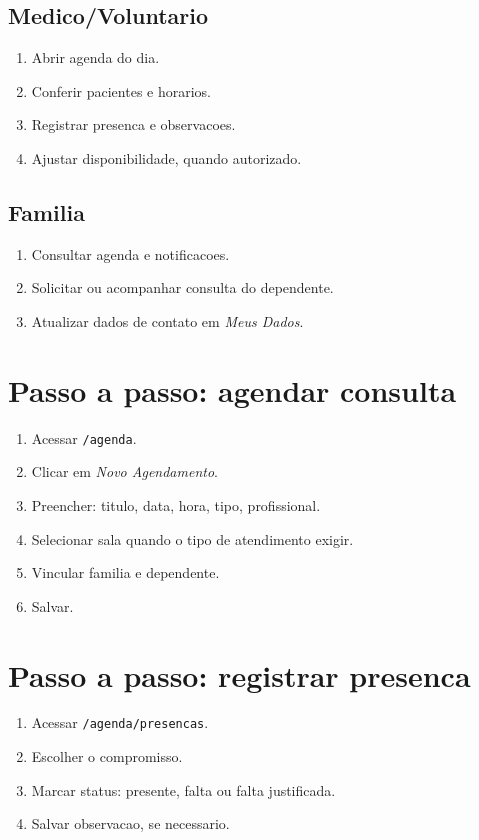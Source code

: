 \documentclass[12pt,a4paper]{article}
\begin{document}
\subsection{Medico/Voluntario}
\begin{enumerate}
\item Abrir agenda do dia.
\item Conferir pacientes e horarios.
\item Registrar presenca e observacoes.
\item Ajustar disponibilidade, quando autorizado.
\end{enumerate}

\subsection{Familia}
\begin{enumerate}
\item Consultar agenda e notificacoes.
\item Solicitar ou acompanhar consulta do dependente.
\item Atualizar dados de contato em \textit{Meus Dados}.
\end{enumerate}

\section{Passo a passo: agendar consulta}
\begin{enumerate}
\item Acessar \texttt{/agenda}.
\item Clicar em \textit{Novo Agendamento}.
\item Preencher: titulo, data, hora, tipo, profissional.
\item Selecionar sala quando o tipo de atendimento exigir.
\item Vincular familia e dependente.
\item Salvar.
\end{enumerate}

\section{Passo a passo: registrar presenca}
\begin{enumerate}
\item Acessar \texttt{/agenda/presencas}.
\item Escolher o compromisso.
\item Marcar status: presente, falta ou falta justificada.
\item Salvar observacao, se necessario.
\end{enumerate}
\end{document}
